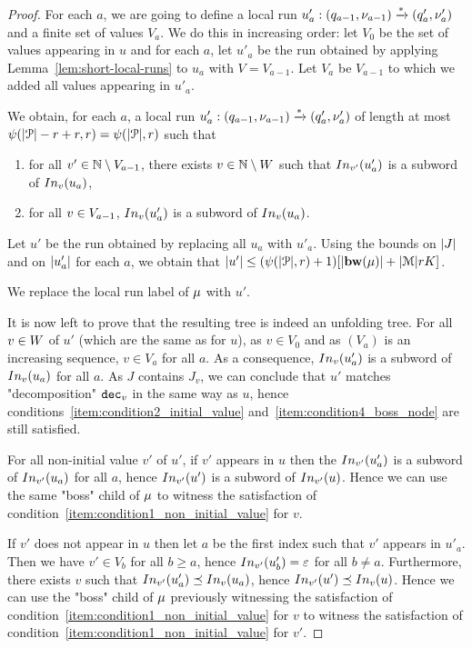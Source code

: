 \begin{proof}
	For each $a$, we are going to define a local run $u'_a : (q_{a-1}, \nu_{a-1}) \xrightarrow{*} (q'_a, \nu'_a)$ and a finite set of values $V_a$.
	We do this in increasing order: let $V_0$ be the set of values appearing in $u$ and for each $a$, let $u'_a$ be the run obtained by applying Lemma~\ref{lem:short-local-runs} to $u_a$ with $V=V_{a-1}$. Let $V_a$ be $V_{a-1}$ to which we added all values appearing in $u'_{a}$.
	
	We obtain, for each $a$, a local run $u'_a : (q_{a-1}, \nu_{a-1}) \xrightarrow{*} (q'_a, \nu'_a)$ of length at most $\psi(|\mathcal{P}|-r+r, r) = \psi(|\mathcal{P}|, r)$ such that 
	\begin{enumerate}
		\item for all $v' \in \mathbb{N} \setminus V_{a-1}$, there exists $v \in \mathbb{N} \setminus W$ such that $\vinput{\aval'}{\localrun'_a}$ is a subword of $\vinput{\aval}{\localrun_a}$,
		\item for all $v \in V_{a-1}$, $\vinput{\aval}{\localrun'_a}$ is a subword of $\vinput{\aval}{\localrun_a}$. 
	\end{enumerate}
Let $u'$ be the run obtained by replacing all $u_a$ with $u'_a$. Using the bounds on $|J|$ and on $|u'_a|$ for each $a$, we obtain that $\size{u'} \leq (\towerfun(\size{\prot}, r) +1) \Large[\size{\bosslabel{\node}}+ \size{\messages}rK\Large]$.

We replace the local run label of $\mu$ with $u'$. 


It is now left to prove that the resulting tree is indeed an unfolding tree.
	For all $v \in W$ of $u'$ (which are the same as for $u$), as $v \in V_0$ and as $(V_a)$ is an increasing sequence, $v \in V_a$ for all $a$. As a consequence, $\vinput{\aval}{\localrun'_a}$ is a subword of $\vinput{\aval}{\localrun_a}$ for all $a$. As $J$ contains $J_v$, we can conclude that $u'$ matches "decomposition" $\mathtt{dec}_v$ in the same way as $u$, hence conditions~\ref{item:condition2_initial_value} and~\ref{item:condition4_boss_node} are still satisfied.
	
	For  all non-initial value $v'$ of $u'$, if $v'$ appears in $u$ then the $\vinput{\aval'}{\localrun'_a}$ is a subword of $\vinput{\aval'}{\localrun_a}$ for all $a$, hence $\vinput{\aval'}{\localrun'}$ is a subword of $\vinput{\aval'}{\localrun}$. Hence we can use the same "boss" child of $\mu$ to witness the satisfaction of condition~\ref{item:condition1_non_initial_value} for $v$.
	
	If $v'$ does not appear in $u$ then let $a$ be the first index such that $v'$ appears in $u'_a$. Then we have $v' \in V_b$ for all $b \geq a$, hence $\vinput{v'}{u'_b} = \epsilon$ for all $b\neq a$. Furthermore, there exists $v$ such that $\vinput{v'}{u'_a} \subword \vinput{v}{u_a}$, hence $\vinput{v'}{u'} \subword \vinput{v}{u}$. Hence we can use the "boss" child of $\mu$ previously witnessing the satisfaction of condition~\ref{item:condition1_non_initial_value} for $v$ to witness the satisfaction of condition~\ref{item:condition1_non_initial_value} for $v'$.
	

\end{proof}
